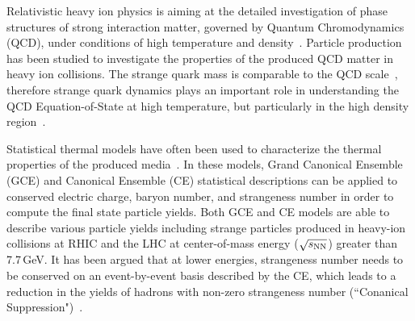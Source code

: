 \documentclass[%
 reprint,	
showpacs,
 amsmath,amssymb,
 aps,
 prc,
]{revtex4-1}
\begin{document}
\maketitle


Relativistic heavy ion physics is aiming at the detailed investigation of phase structures of strong interaction matter, governed by Quantum Chromodynamics (QCD), under conditions of high temperature and density~\cite{akiba2015hot,StarWhitePaper}. Particle production has been studied to investigate the properties of the produced QCD matter in heavy ion collisions. 
The strange quark mass %
is comparable to the QCD scale~\cite{Rafelski:1982pu,Koch:1986ud}, 
therefore strange quark dynamics plays an important role in understanding the QCD Equation-of-State at high temperature, but particularly in the high density region~\cite{KO_sQM17,Danielewicz1592,Tetyana_ICNN,KO.PhysRevLett.55.2661,HADES.Ks2019457,CASSING.openCharm.2001753}. 

Statistical thermal models have often been used to characterize the thermal properties of the produced media~\cite{Andronic_2018Naure,Cleymans:1992zc,Becattini:1997ii,Florkowski:2001fp,Redlich_CE}. In these models, Grand Canonical Ensemble (GCE) and Canonical Ensemble (CE) statistical descriptions can be applied to conserved electric charge, baryon number, and strangeness number in order to compute the final state particle yields. Both GCE and CE models are able to describe various particle yields including strange particles produced in heavy-ion collisions at RHIC and the LHC at center-of-mass energy ($\sqrt{s_{\rm NN}}$) greater than 7.7\,GeV. It has been argued that at lower energies, strangeness number needs to be conserved on an event-by-event basis described by the CE, which leads to a reduction in the yields of hadrons with non-zero strangeness number (``Conanical Suppression")~\cite{Redlich:2001kb}.
\end{document}
